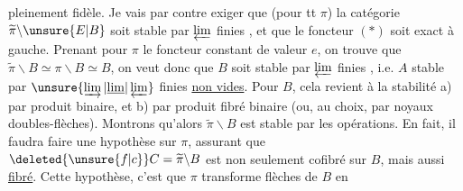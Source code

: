 pleinement fidèle. Je vais par contre exiger que (pour tt $\pi$) la catégorie $\widetilde\pi\backslash \unsure{E|B}$ soit stable par $\varprojlim$ finies , et que le foncteur $(*)$ soit exact à gauche.
Prenant pour $\pi$ le foncteur constant de valeur $e$, on trouve que $\widetilde\pi\backslash B\simeq\pi\backslash B\simeq B$, on veut donc que $B$ soit stable par $\varprojlim$ finies , i.e. $A$ stable par $\unsure{\varinjlim|\underline{\lim}|\varprojlim}$ finies \uline{non vides}. Pour $B$, cela revient à la stabilité a) par produit binaire, et b) par produit fibré binaire (ou, au choix, par noyaux  doubles-flèches). Montrons qu'alors $\widetilde\pi\backslash B$ est stable par les  opérations.
En fait, il faudra faire une hypothèse sur $\pi$, assurant que $\deleted{\unsure{f|c}}C=\widetilde\pi\backslash B$ est non seulement cofibré sur $B$, mais aussi \uline{fibré}. Cette hypothèse, c'est que $\pi$ transforme flèches de $B$ en
